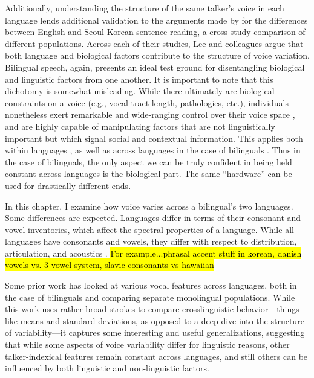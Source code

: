 Additionally, understanding the structure of the same talker's voice in each language lends additional validation to the arguments made by \citet{lee_2020_language} for the differences between English and Seoul Korean sentence reading, a cross-study comparison of different populations. Across each of their studies, Lee and colleagues argue that both language and biological factors contribute to the structure of voice variation. Bilingual speech, again, presents an ideal test ground for disentangling biological and linguistic factors from one another. It is important to note that this dichotomy is somewhat misleading. While there ultimately are biological constraints on a voice (e.g., vocal tract length, pathologies, etc.), individuals nonetheless exert remarkable and wide-ranging control over their voice space \citep{}, and are highly capable of manipulating factors that are not linguistically important but which signal social and contextual information. This applies both within languages \citep{}, as well as across languages in the case of bilinguals \citep{bullock_2009_sociophonetics}. Thus in the case of bilinguals, the only aspect we can be truly confident in being held constant across languages is the biological part. The same ``hardware'' can be used for drastically different ends. 




In this chapter, I examine how voice varies across a bilingual's two languages. Some differences are expected. Languages differ in terms of their consonant and vowel inventories, which affect the spectral properties of a language. While all languages have consonants and vowels, they differ with respect to distribution, articulation, and acoustics . \hl{For example...phrasal accent stuff in korean, danish vowels vs. 3-vowel system, slavic consonants vs hawaiian} 


Some prior work has looked at various vocal features across languages, both in the case of bilinguals and comparing separate monolingual populations. While this work uses rather broad strokes to compare crosslinguistic behavior---things like means and standard deviations, as opposed to a deep dive into the structure of variability---it captures some interesting and useful generalizations, suggesting that while some aspects of voice variability differ for linguistic reasons, other talker-indexical features remain constant across languages, and still others can be influenced by both linguistic and non-linguistic factors. 

